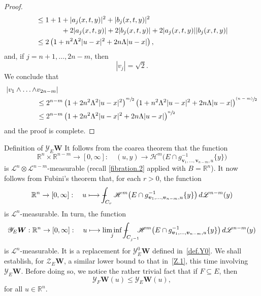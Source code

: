 \documentclass[JEP,XML,SOM,Unicode,ThmDefs,NoEqCountersInSection]{cedram}
\newcommand\mto{\mathchoice{\longmapsto}{\mapsto}{\mapsto}{\mapsto}}
\newcommand{\psfrac}[2]{\sfrac{(#1)}{#2}}
\newenvironment{Empty}[2][\null]{%
\begin{enonce}[remark]{#1}#2}
{\end{enonce}}
\newcommand{\R}{\mathbb{R}}
\newcommand{\Rn}{\R^n}
\newcommand{\calH}{\mathscr{H}}
\newcommand{\calL}{\mathscr{L}}
\newcommand{\calY}{\mathscr{Y}}
\newcommand{\calZ}{\mathscr{Z}}
\newcommand{\bW}{{\boldsymbol{W}}}
\newcommand{\bv}{{\boldsymbol{v}}}
\def\Xint#1{\mathchoice
{\XXint\displaystyle\textstyle{#1}}{\XXint\textstyle\scriptstyle{#1}}{\XXint\scriptstyle\scriptscriptstyle{#1}}{\XXint\scriptscriptstyle
\scriptscriptstyle{#1}}\!\int}
\def\XXint#1#2#3{{\setbox0=\hbox{$#1{#2#3}{\int}$}
\vcenter{\hbox{$#2#3$}}\kern-.5\wd0}}
\def\dashint{\Xint-}
\let\subset\subseteq
\begin{document}
\begin{proof}
\begin{equation*}
\begin{split}
& \leq 1 + 1 + |a_j(x,t,y)|^2 + |b_j(x,t,y)|^2 \\
& \hspace*{1.25cm}+ 2|a_j(x,t,y)| + 2 |b_j(x,t,y)| + 2 |a_j(x,t,y)||b_j(x,t,y)| \\
& \leq 2 \left(1 + n^2 \Lambda^2 |u-x|^2 + 2n\Lambda |u-x| \right),
\end{split}
\end{equation*}
and, if $j=n+1,\ldots,2n-m$, then
\begin{equation*}
\left| v_j \right| = \sqrt{2}.
\end{equation*}
We conclude that
\begin{align*}
|v_1\wedge \ldots \wedge &v_{2n-m} |\\
&\leq 2^{n-m}\left(1 + 2n^2 \Lambda^2|u-x|^2\right)^{\sfrac{m}{2}}\left(1 + n^2 \Lambda^2 |u-x|^2+ 2n\Lambda |u-x| \right)^{\psfrac{n-m}{2}} \\
&\leq 2^{n-m}\left(1 + 2n^2 \Lambda^2|u-x|^2+2n\Lambda |u-x| \right)^{\sfrac{n}{2}}
\end{align*}
and the proof is complete.
\end{proof}

\begin{Empty}[Definition of $\calY_E \bW$]
\label{def.Y}
It follows from the coarea theorem that the function
\begin{equation*}
\Rn \times \R^{n-m} \to [0,\infty]:\quad (u,y) \to \calH^m \bigl(E \cap g_{\bv_1,\ldots,\bv_{n-m},u}^{-1} \{y\}\bigr)
\end{equation*}
is $\calL^n \otimes \calL^{n-m}$-measurable (recall \ref{fibration.2} applied with $B = \Rn$).
It now follows from Fubini's theorem that, for each $r > 0$, the function
\begin{equation*}
\Rn \to [0,\infty]:\quad u \mto \dashint_{C_r} \calH^m \bigl(E \cap g_{\bv_1,\ldots,\bv_{n-m},u}^{-1} \{y\}\bigr) \,d\calL^{n-m}(y)
\end{equation*}
is $\calL^n$-measurable.
In turn, the function
\begin{equation*}
\calY_E \bW: \Rn \to [0,\infty]:\quad u \mto \liminf_j \dashint_{C_{j^{-1}}}\hspace*{-2mm} \calH^m \bigl(E \cap g_{\bv_1,\ldots,\bv_{n-m},u}^{-1} \{y\}\bigr) \,d\calL^{n-m}(y)
\end{equation*}
is $\calL^n$-measurable.
It is a replacement for $\calY^0_E \bW$ defined in~\ref{def.Y0}.
We shall establish, for $\calZ_E \bW$, a similar lower bound to that in~\ref{Z.1}, this time involving $\calY_E \bW$.
Before doing so, we notice the rather trivial fact that if $F \subset E$, then
\begin{equation*}
\calY_F \bW(u) \leq \calY_E \bW(u),
\end{equation*}
for all $u \in \Rn$.
\end{Empty}
\end{document}

